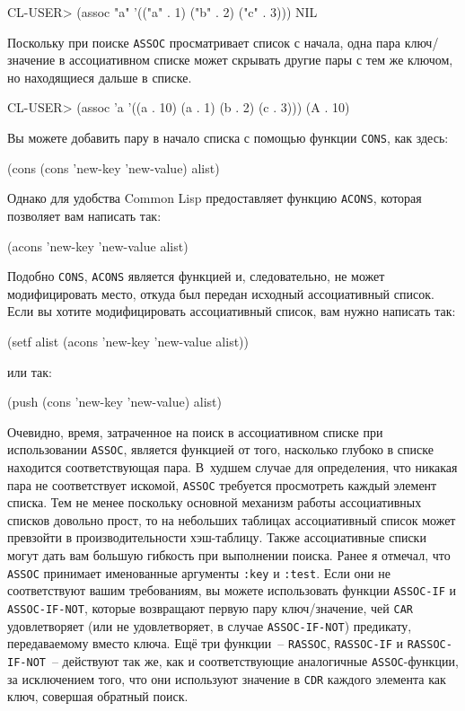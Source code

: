 \begin{myverb}
CL-USER> (assoc "a" '(("a" . 1) ("b" . 2) ("c" . 3)))
NIL
\end{myverb}

Поскольку при поиске \lstinline{ASSOC} просматривает список с начала, одна пара ключ/значение в
ассоциативном списке может скрывать другие пары с тем же ключом, но находящиеся дальше в
списке.

\begin{myverb}
CL-USER> (assoc 'a '((a . 10) (a . 1) (b . 2) (c . 3)))
(A . 10)
\end{myverb}

Вы можете добавить пару в начало списка с помощью функции \lstinline{CONS}, как здесь:

\begin{myverb}
(cons (cons 'new-key 'new-value) alist)
\end{myverb}

Однако для удобства Common Lisp предоставляет функцию \lstinline{ACONS}, которая позволяет вам
написать так:

\begin{myverb}
(acons 'new-key 'new-value alist)
\end{myverb}

Подобно \lstinline{CONS}, \lstinline{ACONS} является функцией и, следовательно, не может
модифицировать место, откуда был передан исходный ассоциативный список. Если вы хотите
модифицировать ассоциативный список, вам нужно написать так:

\begin{myverb}
(setf alist (acons 'new-key 'new-value alist))
\end{myverb}

\noindent{}или так:

\begin{myverb}
(push (cons 'new-key 'new-value) alist)
\end{myverb}

Очевидно, время, затраченное на поиск в ассоциативном списке при использовании
\lstinline{ASSOC}, является функцией от того, насколько глубоко в списке находится
соответствующая пара. В~худшем случае для определения, что никакая пара не соответствует
искомой, \lstinline{ASSOC} требуется просмотреть каждый элемент списка. Тем не менее поскольку
основной механизм работы ассоциативных списков довольно прост, то на небольших таблицах
ассоциативный список может превзойти в производительности хэш-таблицу.  Также
ассоциативные списки могут дать вам большую гибкость при выполнении поиска. Ранее я
отмечал, что \lstinline{ASSOC} принимает именованные аргументы \lstinline{:key} и \lstinline{:test}. Если
они не соответствуют вашим требованиям, вы можете использовать функции \lstinline{ASSOC-IF} и
\lstinline{ASSOC-IF-NOT}, которые возвращают первую пару ключ/значение, чей \lstinline{CAR}
удовлетворяет (или не удовлетворяет, в случае \lstinline{ASSOC-IF-NOT}) предикату,
передаваемому вместо ключа. Ещё три функции~-- \lstinline{RASSOC}, \lstinline{RASSOC-IF} и
\lstinline{RASSOC-IF-NOT}~-- действуют так же, как и соответствующие аналогичные
\lstinline{ASSOC}-функции, за исключением того, что они используют значение в \lstinline{CDR}
каждого элемента как ключ, совершая обратный поиск.

